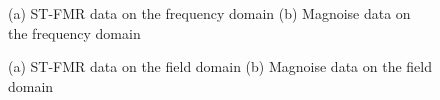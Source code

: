\begin{figure}[!ht]
\centering
{}
\caption{(a) ST-FMR data on the frequency domain (b) Magnoise data on the frequency domain}
\end{figure}




\begin{figure}[!ht]
\centering
{}
\caption{(a) ST-FMR data on the field domain (b) Magnoise data on the field domain}
\end{figure}











